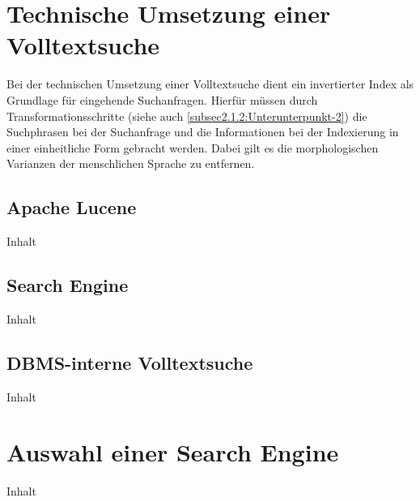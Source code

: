 

\section{Technische Umsetzung einer Volltextsuche\label{sec4.2:Unterpunkt-2}}

Bei der technischen Umsetzung einer Volltextsuche dient ein invertierter Index als Grundlage für eingehende Suchanfragen. Hierfür müssen durch Transformationsschritte (siehe auch \autoref{subsec2.1.2:Unterunterpunkt-2}) die Suchphrasen bei der Suchanfrage und die Informationen bei der Indexierung in einer einheitliche Form gebracht werden. Dabei gilt es die morphologischen Varianzen der menschlichen Sprache zu entfernen.

\subsection{Apache Lucene\label{subsec4.2.1:Unterunterpunkt-1}}

Inhalt

\subsection{Search Engine\label{subsec4.2.2:Unterunterpunkt-2}}

Inhalt

\subsection{DBMS-interne Volltextsuche\label{subsec4.2.3:Unterunterpunkt-3}}

Inhalt

\section{Auswahl einer Search Engine\label{sec4.3:Unterpunkt-3}}

Inhalt


